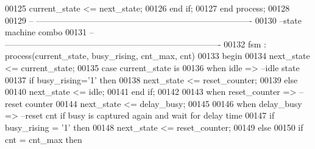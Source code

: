 \begin{DoxyCode}
00125          \textcolor{vhdlchar}{current_state} \textcolor{vhdlchar}{<=} \textcolor{vhdlchar}{next_state};
00126       \textcolor{keywordflow}{end} \textcolor{keywordflow}{if};
00127    \textcolor{keywordflow}{end} \textcolor{keywordflow}{process};
00128 
00129 \textcolor{keyword}{   -- ----------------------------------------------------------------------------}
00130 \textcolor{keyword}{   --state machine combo}
00131 \textcolor{keyword}{   -- ----------------------------------------------------------------------------}
00132    fsm : \textcolor{keywordflow}{process}(current_state, busy_rising, cnt_max, cnt)
00133 \textcolor{vhdlkeyword}{   begin}
00134       \textcolor{vhdlchar}{next_state} \textcolor{vhdlchar}{<=} \textcolor{vhdlchar}{current_state};
00135       \textcolor{keywordflow}{case} \textcolor{vhdlchar}{current_state} \textcolor{keywordflow}{is}
00136          \textcolor{keywordflow}{when} \textcolor{vhdlchar}{idle} \textcolor{vhdlchar}{=}\textcolor{vhdlchar}{>}\textcolor{keyword}{                   --idle state}
00137             \textcolor{keywordflow}{if} \textcolor{vhdlchar}{busy_rising}\textcolor{vhdlchar}{=}\textcolor{vhdlchar}{'}\textcolor{vhdllogic}{}\textcolor{vhdllogic}{1}\textcolor{vhdlchar}{'} \textcolor{keywordflow}{then} 
00138                \textcolor{vhdlchar}{next_state} \textcolor{vhdlchar}{<=} \textcolor{vhdlchar}{reset\_counter};
00139             \textcolor{keywordflow}{else} 
00140                \textcolor{vhdlchar}{next_state} \textcolor{vhdlchar}{<=} \textcolor{vhdlchar}{idle};
00141             \textcolor{keywordflow}{end} \textcolor{keywordflow}{if};
00142               
00143          \textcolor{keywordflow}{when} \textcolor{vhdlchar}{reset\_counter} \textcolor{vhdlchar}{=}\textcolor{vhdlchar}{>}\textcolor{keyword}{          --reset counter}
00144             \textcolor{vhdlchar}{next_state} \textcolor{vhdlchar}{<=} \textcolor{vhdlchar}{delay\_busy};
00145             
00146          \textcolor{keywordflow}{when} \textcolor{vhdlchar}{delay\_busy} \textcolor{vhdlchar}{=}\textcolor{vhdlchar}{>}\textcolor{keyword}{                 --reset cnt if busy is captured again and wait for delay time}
00147                 \textcolor{keywordflow}{if} \textcolor{vhdlchar}{busy_rising} \textcolor{vhdlchar}{=} \textcolor{vhdlchar}{'}\textcolor{vhdllogic}{}\textcolor{vhdllogic}{1}\textcolor{vhdlchar}{'} \textcolor{keywordflow}{then} 
00148                     \textcolor{vhdlchar}{next_state} \textcolor{vhdlchar}{<=} \textcolor{vhdlchar}{reset\_counter};
00149                 \textcolor{keywordflow}{else}
00150                     \textcolor{keywordflow}{if} \textcolor{vhdlchar}{cnt} \textcolor{vhdlchar}{=} \textcolor{vhdlchar}{cnt_max} \textcolor{keywordflow}{then} 

\end{DoxyCode}
